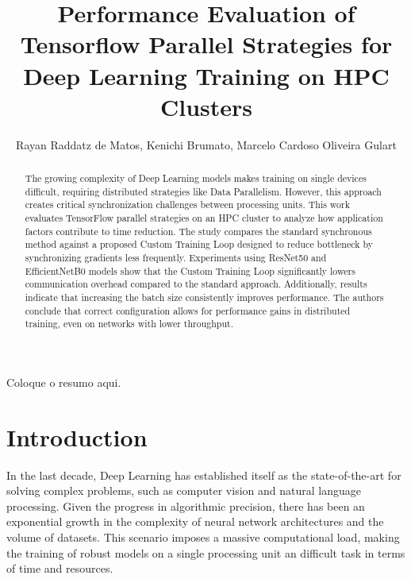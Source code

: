 \documentclass[12pt]{article}
\date{}
\title{Performance Evaluation of Tensorflow Parallel Strategies for Deep Learning Training on HPC Clusters}
\begin{document}
\makeatletter
\let\orgtitle\@title
\makeatother

\title{\orgtitle}

\author{
   Rayan Raddatz de Matos,
   Kenichi Brumato,
   Marcelo Cardoso Oliveira Gulart
}

\address{
   Institute of Informatics, Federal University of Rio Grande do Sul (UFRGS)\\
   Caixa Postal 15.064 -- 91.501-970 -- Porto Alegre -- RS -- Brazil
   }

\maketitle


\begin{abstract}
The growing complexity of Deep Learning models makes training on single devices difficult, requiring distributed strategies like Data Parallelism. However, this approach creates critical synchronization challenges between processing units. This work evaluates TensorFlow parallel strategies on an HPC cluster to analyze how application factors contribute to time reduction. The study compares the standard synchronous method against a proposed Custom Training Loop designed to reduce bottleneck by synchronizing gradients less frequently. Experiments using ResNet50 and EfficientNetB0 models show that the Custom Training Loop significantly lowers communication overhead compared to the standard approach. Additionally, results indicate that increasing the batch size consistently improves performance. The authors conclude that correct configuration allows for performance gains in distributed training, even on networks with lower throughput.
\end{abstract}

\begin{resumo}
Coloque o resumo aqui.
\end{resumo}

\section{Introduction}
\label{sec:org58ffb29}

In the last decade, Deep Learning has established itself as the
state-of-the-art for solving complex problems, such as computer vision
and natural language processing. Given the progress in algorithmic
precision, there has been an exponential growth in the complexity of
neural network architectures and the volume of datasets. This scenario
imposes a massive computational load, making the training of robust
models on a single processing unit an difficult task in terms of time
and resources.
\end{document}
